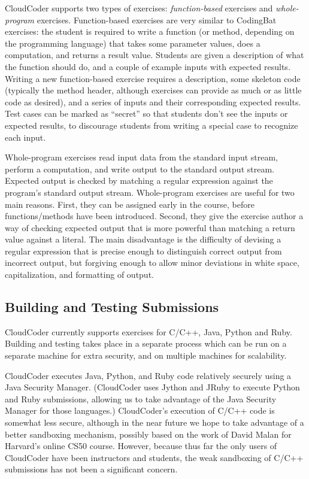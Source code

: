 \documentclass{sig-alternate}
\begin{document}
CloudCoder supports two types of exercises:  {\em function-based}
exercises and {\em whole-program} exercises.  Function-based exercises are
very similar to CodingBat exercises: the student is required to write
a function (or method, depending on the programming language) that takes some parameter values,
does a computation, and returns a result value.
Students are given a description of
what the function should do, and a couple of example inputs with
expected results.  Writing a new function-based exercise
requires a description, some skeleton code (typically the method
header, although exercises can provide as much or as little code as
desired), and a series of inputs and their corresponding expected results.
Test cases can be marked as ``secret'' so that students don't see the
inputs or expected results, to discourage students from writing a special case to
recognize each input.

Whole-program exercises read input data from
the standard input stream, perform a computation, and write output to the standard output stream.
Expected output is checked by matching a regular expression against the
program's standard output stream.
Whole-program exercises are useful for two main reasons.  First,
they can be assigned early in the course, before functions/methods
have been introduced.  Second, they give the exercise author a
way of checking expected output that is more powerful than matching a return
value against a literal.  The main disadvantage is
the difficulty of devising a
regular expression that is precise enough to distinguish correct output
from incorrect output, but forgiving enough to allow minor deviations
in white space, capitalization, and formatting of output.

\subsection{Building and Testing Submissions}

CloudCoder currently supports exercises for C/C++, Java, Python and
Ruby.  Building and testing takes place in a separate process which
can be run on a separate machine for extra security, and on multiple
machines for scalability.

CloudCoder executes Java, Python, and Ruby code relatively securely using
a Java Security Manager.
(CloudCoder uses Jython\cite{jython} and JRuby\cite{jruby}
to execute Python and Ruby submissions, allowing us to take advantage of
the Java Security Manager for those languages.)
CloudCoder's execution of C/C++ code is somewhat less secure, although 
in the near future
we hope to take advantage of a better sandboxing mechanism,
possibly based on the work of
David Malan for Harvard's online CS50 course\cite{Malan:2013:CSS:2445196.2445242}.
However, because thus far the only users of
CloudCoder have been instructors and students,
the weak sandboxing of C/C++ submissions has not been a significant concern.
\end{document}
